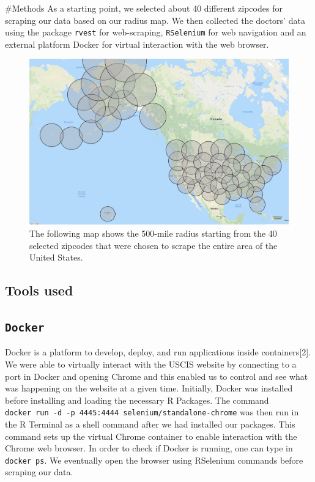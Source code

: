\documentclass[10pt,letterpaper]{article}
\begin{document}
\#Methods As a starting point, we selected about 40 different zipcodes
for scraping our data based on our radius map. We then collected the
doctors' data using the package \texttt{rvest} for web-scraping,
\texttt{RSelenium} for web navigation and an external platform Docker
for virtual interaction with the web browser.

\begin{figure}
\includegraphics[width=1\linewidth]{RadiusMap} \caption{The following map shows the 500-mile radius starting from the 40 selected zipcodes that were chosen to scrape the entire area of the United States.}\label{fig:unnamed-chunk-1}
\end{figure}

\hypertarget{tools-used}{%
\subsection{Tools used}\label{tools-used}}

\hypertarget{docker}{%
\subsection{\texorpdfstring{\texttt{Docker}}{Docker}}\label{docker}}

Docker is a platform to develop, deploy, and run applications inside
containers{[}2{]}. We were able to virtually interact with the USCIS
website by connecting to a port in Docker and opening Chrome and this
enabled us to control and see what was happening on the website at a
given time. Initially, Docker was installed before installing and
loading the necessary R Packages. The command
\texttt{docker\ run\ -d\ -p\ 4445:4444\ selenium/standalone-chrome} was
then run in the R Terminal as a shell command after we had installed our
packages. This command sets up the virtual Chrome container to enable
interaction with the Chrome web browser. In order to check if Docker is
running, one can type in \texttt{docker\ ps}. We eventually open the
browser using RSelenium commands before scraping our data.
\end{document}
